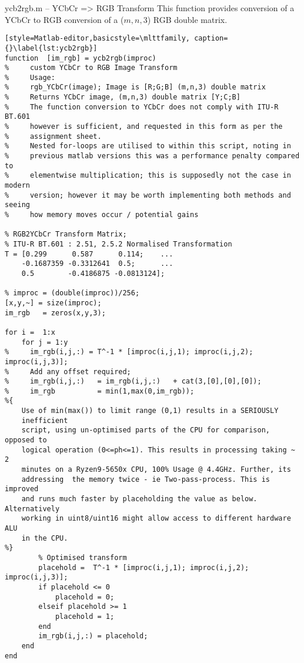 \begin{codeblock}{ycb2rgb.m -- YCbCr => RGB Transform}
    This function provides conversion of a YCbCr to RGB conversion of a ($m,n,3$) RGB double matrix.
        
    \begin{lstlisting}[style=Matlab-editor,basicstyle=\mlttfamily, caption={}\label{lst:ycb2rgb}]
function  [im_rgb] = ycb2rgb(improc)
%     custom YCbCr to RGB Image Transform
%     Usage:
%     rgb_YCbCr(image); Image is [R;G;B] (m,n,3) double matrix
%     Returns YCbCr image, (m,n,3) double matrix [Y;C;B]
%     The function conversion to YCbCr does not comply with ITU-R BT.601
%     however is sufficient, and requested in this form as per the 
%     assignment sheet.
%     Nested for-loops are utilised to within this script, noting in 
%     previous matlab versions this was a performance penalty compared to 
%     elementwise multiplication; this is supposedly not the case in modern
%     version; however it may be worth implementing both methods and seeing
%     how memory moves occur / potential gains

% RGB2YCbCr Transform Matrix;
% ITU-R BT.601 : 2.51, 2.5.2 Normalised Transformation 
T = [0.299      0.587      0.114;    ...
    -0.1687359 -0.3312641  0.5;      ...
    0.5        -0.4186875 -0.0813124]; 

% improc = (double(improc))/256;
[x,y,~] = size(improc);
im_rgb   = zeros(x,y,3);

for i =  1:x
    for j = 1:y
%     im_rgb(i,j,:) = T^-1 * [improc(i,j,1); improc(i,j,2); improc(i,j,3)]; 
%     Add any offset required; 
%     im_rgb(i,j,:)   = im_rgb(i,j,:)   + cat(3,[0],[0],[0]);    
%     im_rgb          = min(1,max(0,im_rgb));
%{        
    Use of min(max()) to limit range (0,1) results in a SERIOUSLY 
    inefficient
    script, using un-optimised parts of the CPU for comparison, opposed to
    logical operation (0<=ph<=1). This results in processing taking ~ 2
    minutes on a Ryzen9-5650x CPU, 100% Usage @ 4.4GHz. Further, its
    addressing  the memory twice - ie Two-pass-process. This is improved 
    and runs much faster by placeholding the value as below. Alternatively
    working in uint8/uint16 might allow access to different hardware ALU 
    in the CPU.
%}        
        % Optimised transform
        placehold =  T^-1 * [improc(i,j,1); improc(i,j,2); improc(i,j,3)]; 
        if placehold <= 0
            placehold = 0;
        elseif placehold >= 1
            placehold = 1;
        end
        im_rgb(i,j,:) = placehold;
    end
end

    \end{lstlisting}
\end{codeblock}




